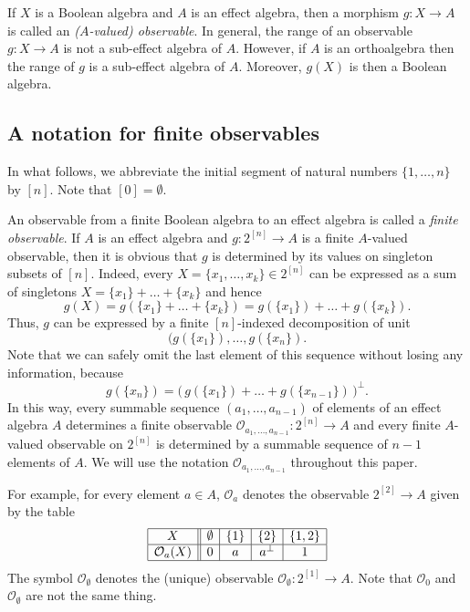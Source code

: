 \documentclass[smallextended]{svjour3}
\begin{document}
If $X$ is a Boolean algebra and $A$ is an effect algebra, then a morphism
$g:X\to A$ is called an {\em ($A$-valued) observable}. 
In general, the range of an observable $g:X\to A$ is not 
a sub-effect algebra of $A$. However, if $A$ is an orthoalgebra
then the range of $g$ is a sub-effect algebra of $A$.
Moreover, $g(X)$ is then a Boolean algebra.

\subsection{A notation for finite observables}

In what follows, we abbreviate the initial segment of natural numbers
$\{1,\dots,n\}$ by $[n]$. Note that $[0]=\emptyset$.

An observable from a finite Boolean algebra to an effect algebra is called
a {\em finite observable}.  If $A$ is an effect algebra and
$g:2^{[n]}\to A$ is a finite $A$-valued observable, then it is obvious that $g$ is
determined by its values on singleton subsets of $[n]$. Indeed, 
every $X=\{x_1,\dots,x_k\}\in 2^{[n]}$ can be expressed as 
a sum of singletons $X=\{x_1\}+\dots+\{x_k\}$ and hence 
$$
g(X)=g(\{x_1\}+\dots+\{x_k\})=g(\{x_1\})+\dots+g(\{x_k\}).
$$
Thus, $g$ can be expressed by a finite $[n]$-indexed decomposition of unit 
$$
(g(\{x_1\}),\dots,g(\{x_n\}).
$$
Note that we can safely omit the last element
of this sequence without losing any information, because
$$
g(\{x_n\})=\bigl(\,g(\{x_1\})+\dots+g(\{x_{n-1}\})\,\bigr)^\perp.
$$
In this way, every summable sequence $(a_1,\dots,a_{n-1})$ of elements of an effect algebra $A$ 
determines a finite observable
${\mathcal O_{{a_1,\dots,a_{n-1}}}}:2^{[n]}\to A$ and every finite $A$-valued observable on $2^{[n]}$
is determined by a summable sequence of $n-1$ elements of $A$.
We will use the notation ${\mathcal O_{{a_1,\dots,a_{n-1}}}}$ throughout this paper.

For example, for every element $a\in A$, ${\mathcal O_{{a}}}$ denotes the observable $2^{[2]}\to A$ given by 
the table
$$
\begin{array}{|c||c|c|c|c|}
\hline
X& \emptyset & \{1\} & \{2\} & \{1,2\} \\
\hline
{\mathcal O_{{a}}}(X)&0 & a & a^\perp & 1\\
\hline
\end{array}
$$
The symbol ${\mathcal O_{{\emptyset}}}$ denotes the (unique) observable ${\mathcal O_{{\emptyset}}}:2^{[1]}\to A$.
Note that ${\mathcal O_{{0}}}$ and ${\mathcal O_{{\emptyset}}}$ are not the same thing.
\end{document}
